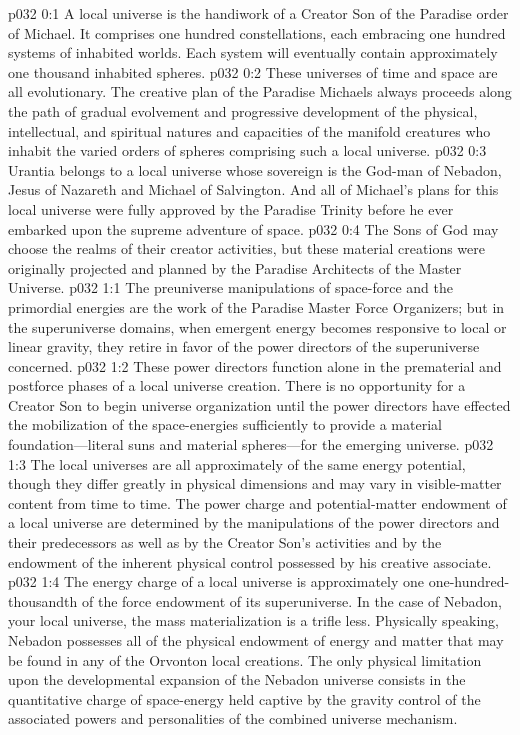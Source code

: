 \author{Mighty Messenger}
\vs p032 0:1 A local universe is the handiwork of a Creator Son of the Paradise order of Michael. It comprises one hundred constellations, each embracing one hundred systems of inhabited worlds. Each system will eventually contain approximately one thousand inhabited spheres.
\vs p032 0:2 These universes of time and space are all evolutionary. The creative plan of the Paradise Michaels always proceeds along the path of gradual evolvement and progressive development of the physical, intellectual, and spiritual natures and capacities of the manifold creatures who inhabit the varied orders of spheres comprising such a local universe.\plusone
\vs p032 0:3 Urantia belongs to a local universe whose sovereign is the God\hyp{}man of Nebadon, Jesus of Nazareth and Michael of Salvington. And all of Michael’s plans for this local universe were fully approved by the Paradise Trinity before he ever embarked upon the supreme adventure of space.
\vs p032 0:4 The Sons of God may choose the realms of their creator activities, but these material creations were originally projected and planned by the Paradise Architects of the Master Universe.
\vs p032 1:1 The preuniverse manipulations of space\hyp{}force and the primordial energies are the work of the Paradise Master Force Organizers; but in the superuniverse domains, when emergent energy becomes responsive to local or linear gravity, they retire in favor of the power directors of the superuniverse concerned.
\vs p032 1:2 These power directors function alone in the prematerial and postforce phases of a local universe creation. There is no opportunity for a Creator Son to begin universe organization until the power directors have effected the mobilization of the space\hyp{}energies sufficiently to provide a material foundation---literal suns and material spheres---for the emerging universe.\plusone
\pc \vs p032 1:3 The local universes are all approximately of the same energy potential, though they differ greatly in physical dimensions and may vary in visible\hyp{}matter content from time to time. The power charge and potential\hyp{}matter endowment of a local universe are determined by the manipulations of the power directors and their predecessors as well as by the Creator Son’s activities and by the endowment of the inherent physical control possessed by his creative associate.\plusone
\vs p032 1:4 The energy charge of a local universe is approximately one one\hyp{}hundred\hyp{}thousandth of the force endowment of its superuniverse. In the case of Nebadon, your local universe, the mass materialization is a trifle less. Physically speaking, Nebadon possesses all of the physical endowment of energy and matter that may be found in any of the Orvonton local creations. The only physical limitation upon the developmental expansion of the Nebadon universe consists in the quantitative charge of space\hyp{}energy held captive by the gravity control of the associated powers and personalities of the combined universe mechanism.
